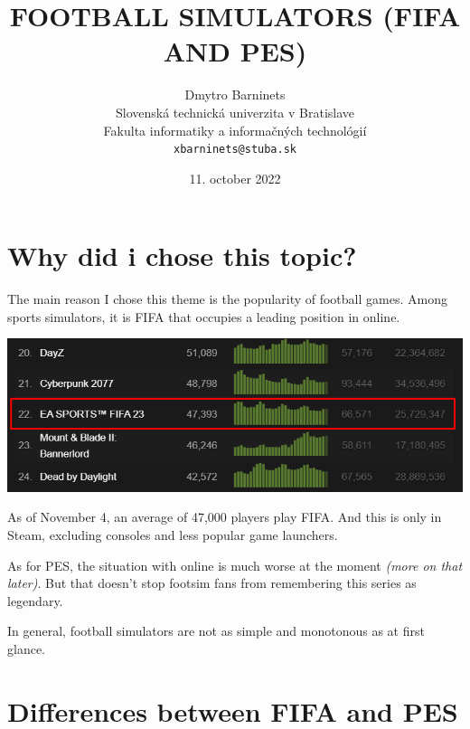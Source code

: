\documentclass[12pt,twoside,english,a4paper]{article}
\title{FOOTBALL SIMULATORS (FIFA AND PES)}
\author{Dmytro Barninets\\[2pt]
	{\small Slovenská technická univerzita v Bratislave}\\
	{\small Fakulta informatiky a informačných technológií}\\
	{\large \texttt{xbarninets@stuba.sk}}
	}
\date{\large 11. october 2022}
\begin{document}
\maketitle


\section{Why did i chose this topic?} \label{mainparagraph}

The main reason I chose this theme is the popularity of football games. Among sports simulators, it is FIFA that occupies a leading position in online.


\includegraphics[width=150mm,scale=1.5]{fifa_charts.png} \label{chartsphoto}


As of November 4, an average of 47,000 players play FIFA. And this is only in Steam, excluding consoles and less popular game launchers.


As for PES, the situation with online is much worse at the moment \emph{(more on that later)}. But that doesn't stop footsim fans from remembering this series as legendary.

In general, football simulators are not as simple and monotonous as at first glance.

\section{Differences between FIFA and PES} \label{differences}\cite{Gaming.net}
\end{document}
